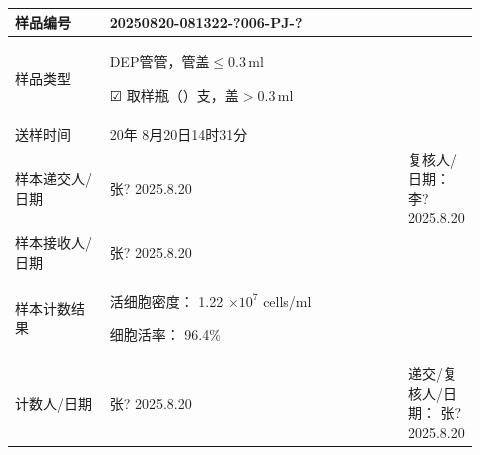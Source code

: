 \documentclass[UTF8,10pt,a4paper,fontset=fandol]{ctexart}
\newcommand{\fieldvalue}[1]{#1}
\newcommand{\handwritten}[1]{#1}
\newcommand{\checkboxfield}[1]{\ifstrequal{#1}{checked}{☑}{\ifstrequal{#1}{unclear}{?}{☐}}}
\begin{document}
\begin{tabular}{|p{0.22\linewidth}|p{0.70\linewidth}|}
\hline
样品编号 &
\fieldvalue{\handwritten{20250820-081322-?006-PJ-?}} \\ \hline
样品类型 &
DEP管\underline{\hspace{1.2cm}}管，管盖$\leq 0.3$\,ml

\fieldvalue{\handwritten{\checkboxfield{checked}}}
取样瓶（\hspace{0.4cm}）支，盖$>0.3$\,ml
\\ \hline
送样时间 &
20\underline{\hspace{0.35cm}}年
\fieldvalue{\handwritten{8月20日14时31分}} \\ \hline
样本递交人/日期 &
\fieldvalue{\handwritten{张?}}
\quad
\fieldvalue{\handwritten{2025.8.20}}
&
复核人/日期：
\fieldvalue{\handwritten{李?}}
\quad
\fieldvalue{\handwritten{2025.8.20}}
\\ \hline
样本接收人/日期 &
\fieldvalue{\handwritten{张?}}
\quad
\fieldvalue{\handwritten{2025.8.20}}
& \\ \hline
样本计数结果 &
活细胞密度：
\fieldvalue{\handwritten{1.22}}
$\times 10^7$ cells/ml

\par
细胞活率：
\fieldvalue{\handwritten{96.4}}\%
& \\ \hline
计数人/日期 &
\fieldvalue{\handwritten{张?}}
\quad
\fieldvalue{\handwritten{2025.8.20}}
&
递交/复核人/日期：
\fieldvalue{\handwritten{张?}}
\quad
\fieldvalue{\handwritten{2025.8.20}}
\\ \hline
\end{tabular}
\end{document}
